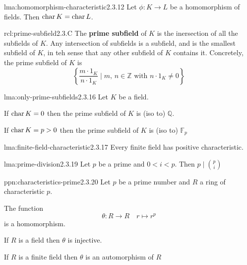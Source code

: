 \documentclass[landscape, 8pt]{extarticle}
\begin{document}
\begin{multicols}{3}
\begin{lma}{lma:homomorphism-characteristic}{2.3.12}
    Let $\phi : K \to L$ be a homomorphism of fields. Then $\operatorname{char} K = \operatorname{char} L$.
\end{lma}

\begin{rcl}{rcl:prime-subfield}{2.3.C}
    The \textbf{prime subfield} of $K$ is the inersection of all the subfields of $K$. Any intersection of subfields is a subfield, and is the smallest subfield of $K$, in teh sense that any other subfield of $K$ contains it. Concretely, the prime subfield of $K$ is
    \[\left\{ \frac{m \cdot 1_{K}}{n \cdot 1_{K}} \mid m,\,n\in \mathbb{Z} \text{ with } n \cdot 1_{K} \ne 0\right\}\]
\end{rcl}

\begin{lma}{lma:only-prime-subfields}{2.3.16}
    Let $K$ be a field.
    \begin{itemize-tight}
        \item If $\operatorname{char} K = 0$ then the prime subfield of $K$ is (iso to) $\mathbb{Q}$.
        \item If $\operatorname{char} K = p > 0$ then the prime subfield of $K$ is (iso to) $\mathbb{F}_{p}$
    \end{itemize-tight}
\end{lma}

\begin{lma}{lma:finite-field-characteristic}{2.3.17}
    Every finite field has positive characteristic.
\end{lma}

\begin{lma}{lma:prime-division}{2.3.19}
    Let $p$ be a prime and $0 < i < p$. Then $p \mid \binom{p}{i}$
\end{lma}

\begin{ppn}{ppn:characteristics-prime}{2.3.20}
    Let $p$ be a prime number and $R$ a ring of characteristic $p$.
    \begin{enumerate-tight}
        \item The function
            \[\theta : R \to R \quad r \mapsto r^{p}\]
            is a homomorphism.
        \item If $R$ is a field then $\theta$ is injective.
        \item If $R$ is a finite field then $\theta$ is an automorphism of $R$
    \end{enumerate-tight}


\end{ppn}
\end{multicols}
\end{document}
